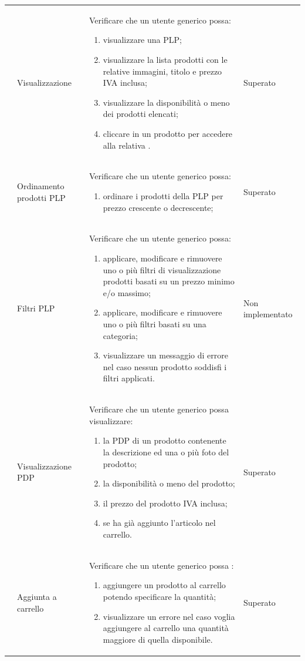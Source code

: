 \begin{center}
\begin{longtable}{|p{0.85cm}|p{2.25cm}|p{9cm}|p{3cm}|}
		 & Visualizzazione \glock{PLP} & Verificare che un utente generico possa: 
		\begin{enumerate}
			\item  visualizzare una PLP;
			\item  visualizzare la lista prodotti con le relative immagini, titolo e prezzo IVA inclusa;
			\item  visualizzare la disponibilità o meno dei prodotti elencati;
			\item  cliccare in un prodotto per accedere alla relativa \glock{PDP}.
		\end{enumerate} & Superato\\

		 & Ordinamento prodotti PLP & Verificare che un utente generico possa: 
		\begin{enumerate}
			\item  ordinare i prodotti della PLP per prezzo crescente o decrescente;
		\end{enumerate} & Superato \\

		 & Filtri PLP & Verificare che un utente generico possa: 
		\begin{enumerate}
			\item  applicare, modificare e rimuovere uno o più filtri di visualizzazione prodotti basati su un prezzo minimo e/o massimo;
			\item  applicare, modificare e rimuovere uno o più filtri basati su una categoria;
			\item  visualizzare un messaggio di errore nel caso nessun prodotto soddisfi i filtri applicati.
		\end{enumerate} & Non implementato\\

		 & Visualizzazione PDP & Verificare che un utente generico possa visualizzare: 
		\begin{enumerate}
			\item   la PDP di un prodotto contenente la descrizione ed una o più foto del prodotto;
			\item   la disponibilità o meno del prodotto;
			\item   il prezzo del prodotto IVA inclusa;
			\item   se ha già aggiunto l'articolo nel carrello.
		\end{enumerate} & Superato\\

		 & Aggiunta a carrello & Verificare che un utente generico possa : 
		\begin{enumerate}
			\item   aggiungere un prodotto al carrello potendo specificare la quantità;
			\item   visualizzare un errore nel caso voglia aggiungere al carrello una quantità maggiore di quella disponibile.
		\end{enumerate} & Superato\\


\end{longtable}
\end{center}
